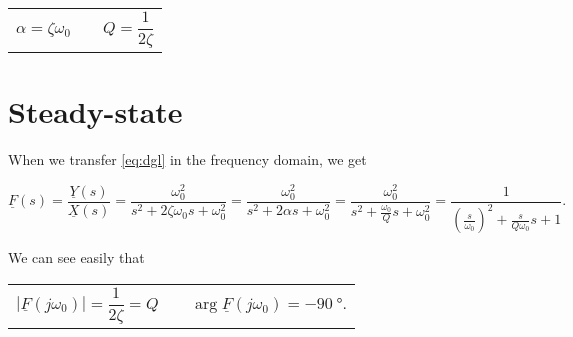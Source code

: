 \documentclass{article}[11pt]
\begin{document}
\begin{center}
\begin{tabular}{p{4cm}p{2cm}p{4cm}}
  \begin{equation}
    \alpha = \zeta \omega_0
  \end{equation}
  &
  &
  \begin{equation}
    Q =\frac{1}{2\zeta}
  \end{equation}
\end{tabular}
\end{center}

\section{Steady-state}

When we transfer \eqref{eq:dgl} in the frequency domain, we get

\begin{equation}\label{eq:fs}
\underline{F}(s) = \frac{\underline{Y}(s)}{\underline{X}(s)} 
                 = \frac{\omega_0^2}{s^2 + 2 \zeta \omega_0 s + \omega_0^2 }
                 = \frac{\omega_0^2}{s^2 + 2 \alpha s + \omega_0^2 }
                 = \frac{\omega_0^2}{s^2 + \frac{\omega_0}{Q} s + \omega_0^2 }
                 = \frac{1}{\left(\frac{s}{\omega_0}\right)^2 + \frac{s}{Q\omega_0} s + 1 }
.
\end{equation}

We can see easily that
\begin{center}
\begin{tabular}{p{5cm}p{2cm}p{5cm}}
  \begin{equation}
    \left|\underline{F}(j\omega_0)\right| = \frac{1}{2 \zeta} = Q
  \end{equation}
  &
  &
  \begin{equation}
    \arg{\underline{F}(j\omega_0)} = -\SI{90}{\degree}.
  \end{equation}
\end{tabular}
\end{center}
\end{document}
